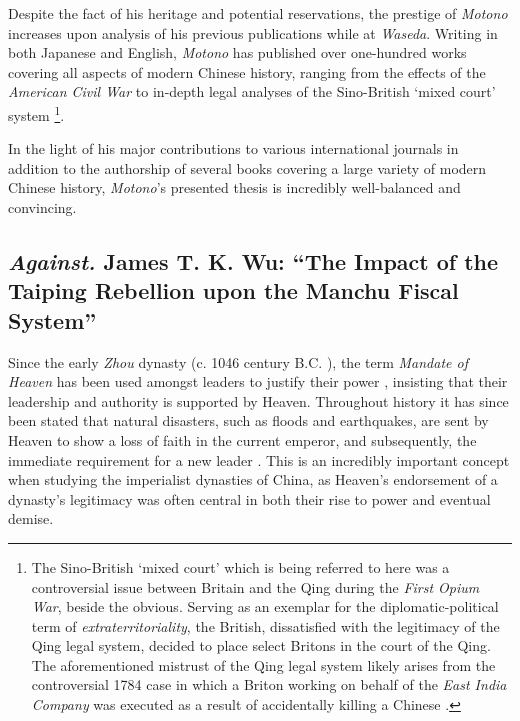 \documentclass{article}
\begin{document}
        Despite the fact of his heritage and potential reservations, the prestige of \textit{Motono} increases upon analysis of his previous publications while at \textit{Waseda}. Writing in both Japanese and English, \textit{Motono} has published over one-hundred works covering all aspects of modern Chinese history, ranging from the effects of the \textit{American Civil War} \autocite{Motono:1984} to in-depth legal analyses of the Sino-British `mixed court' system \autocite{Motono:1996}\footnote{The Sino-British `mixed court' which is being referred to here was a controversial issue between Britain and the Qing during the \textit{First Opium War}, beside the obvious. Serving as an exemplar for the diplomatic-political term of \textit{extraterritoriality}, the British, dissatisfied with the legitimacy of the Qing legal system, decided to place select Britons in the court of the Qing. The aforementioned mistrust of the Qing legal system likely arises from the controversial 1784 case in which a Briton working on behalf of the \textit{East India Company} was executed as a result of accidentally killing a Chinese \autocite{Cassel:2012}.}.

        In the light of his major contributions to various international journals in addition to the authorship of several books covering a large variety of modern Chinese history, \textit{Motono}'s presented thesis is incredibly well-balanced and convincing.

\subsection{\emph{Against.} James T. K. Wu: ``The Impact of the Taiping Rebellion upon the Manchu Fiscal System''}

        Since the early \textit{Zhou} dynasty (c. 1046 century B.C. \autocite{Loewe:1999}), the term \textit{Mandate of Heaven} has been used amongst leaders to justify their power \autocite{Zhao:2009}, insisting that their leadership and authority is supported by Heaven. Throughout history it has since been stated that natural disasters, such as floods and earthquakes, are sent by Heaven to show a loss of faith in the current emperor, and subsequently, the immediate requirement for a new leader \autocite{Elvin:1998}. This is an incredibly important concept when studying the imperialist dynasties of China, as Heaven's endorsement of a dynasty's legitimacy was often central in both their rise to power and eventual demise.
\end{document}
